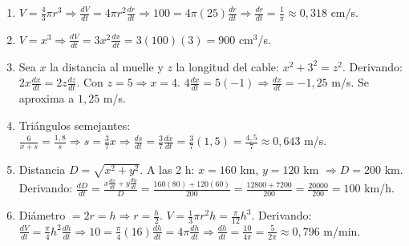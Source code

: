\documentclass[12pt, letterpaper]{article}
\begin{document}
  \begin{enumerate}[resume=respuestas, leftmargin=*, label=\textbf{\arabic*.}]
    \item $V = \frac{4}{3}\pi r^3 \Rightarrow \frac{dV}{dt} = 4\pi r^2 \frac{dr}{dt} \Rightarrow 100 = 4\pi(25)\frac{dr}{dt} \Rightarrow \frac{dr}{dt} = \frac{1}{\pi} \approx 0{,}318$ cm/s.
    \item $V = x^3 \Rightarrow \frac{dV}{dt} = 3x^2 \frac{dx}{dt} = 3(100)(3) = 900$ cm$^3$/s.
    \item Sea $x$ la distancia al muelle y $z$ la longitud del cable: $x^2 + 3^2 = z^2$. Derivando: $2x\frac{dx}{dt} = 2z\frac{dz}{dt}$. Con $z = 5 \Rightarrow x = 4$. $4\frac{dx}{dt} = 5(-1) \Rightarrow \frac{dx}{dt} = -1{,}25$ m/s. Se aproxima a $1{,}25$ m/s.
    \item Triángulos semejantes: $\frac{6}{x+s} = \frac{1{,}8}{s} \Rightarrow s = \frac{3}{7}x \Rightarrow \frac{ds}{dt} = \frac{3}{7}\frac{dx}{dt} = \frac{3}{7}(1{,}5) = \frac{4{,}5}{7} \approx 0{,}643$ m/s.
    \item Distancia $D = \sqrt{x^2 + y^2}$. A las 2 h: $x = 160$ km, $y = 120$ km $\Rightarrow D = 200$ km. Derivando: $\frac{dD}{dt} = \frac{x\frac{dx}{dt} + y\frac{dy}{dt}}{D} = \frac{160(80) + 120(60)}{200} = \frac{12800 + 7200}{200} = \frac{20000}{200} = 100$ km/h.
    \item Diámetro $= 2r = h \Rightarrow r = \frac{h}{2}$. $V = \frac{1}{3}\pi r^2 h = \frac{\pi}{12}h^3$. Derivando: $\frac{dV}{dt} = \frac{\pi}{4}h^2 \frac{dh}{dt} \Rightarrow 10 = \frac{\pi}{4}(16)\frac{dh}{dt} = 4\pi \frac{dh}{dt} \Rightarrow \frac{dh}{dt} = \frac{10}{4\pi} = \frac{5}{2\pi} \approx 0{,}796$ m/min.
  \end{enumerate}


\end{document}
